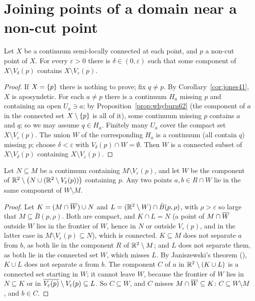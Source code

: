 
\section{Joining points of a domain near a non-cut point}

\begin{lemma}\label{lem:whyburn622}
Let $X$ be a continuum semi-locally connected at each point, and $p$ a non-cut point of $X$. For every $\varepsilon>0$ there is $\delta\in(0,\varepsilon)$
such that some component of $X\setminus V_\delta(p)$ contains $X\setminus V_\varepsilon(p)$.
\end{lemma}

\begin{proof}
If $X=\left\{ p \right\}$ there is nothing to prove; fix $q\ne p$. By Corollary~\ref{cor:jones41}, $X$ is aposyndetic. For each $a\ne p$ there is a continuum $H_a$
missing $p$ and containing an open $U_a\ni a$; by Proposition~\ref{prop:whyburn62} (the component of $a$ in the connected set $X\setminus\left\{ p \right\}$ is all of it), some
continuum missing $p$ contains $a$ and $q$; so we may assume $q\in H_a$. Finitely many $U_a$ cover the compact set $X\setminus V_\varepsilon(p)$. The union $W$ of the
corresponding $H_a$ is a continuum (all contain $q$) missing $p$; choose $\delta<\varepsilon$ with $V_\delta(p)\cap W=\emptyset$. Then $W$ is a connected subset of $X\setminus V_\delta(p)$
containing $X\setminus V_\varepsilon(p)$.
\end{proof}


\begin{lemma}\label{lem:join}
Let $N\subseteq M$ be a continuum containing $M\setminus V_\varepsilon(p)$, and let $W$ be the component of $\mathbb{R}^2\setminus\bigl(N\cup(\mathbb{R}^2\setminus V_\varepsilon(p))\bigr)$ containing $p$. Any two
points $a,b\in R\cap W$ lie in the same component of $W\setminus M$.
\end{lemma}

\begin{proof}
Let $K=(M\cap\overline{W})\cup N$ and $L=(\mathbb{R}^2\setminus W)\cap\bar B(p,\rho)$, with $\rho>\varepsilon$ so large that $M\subseteq\bar B(p,\rho)$. Both are compact, and $K\cap L=N$ (a point of $M\cap\overline{W}$ outside $W$ lies in the frontier of $W$,
hence in $N$ or outside $V_\varepsilon(p)$, and in the latter case in $M\setminus V_\varepsilon(p)\subseteq N$), which is connected. $K\subseteq M$ does not separate $a$ from $b$, as both lie in the component
$R$ of $\mathbb{R}^2\setminus M$; and $L$ does not separate them, as both lie in the connected set $W$, which misses $L$. By Janiszewski's theorem (), $K\cup L$ does not
separate $a$ from $b$. The component $C$ of $a$ in $\mathbb{R}^2\setminus(K\cup L)$ is a connected set starting in $W$; it cannot leave $W$, because the frontier of $W$ lies in $N\subseteq K$ or in
$\overline{V_\varepsilon(p)}\setminus V_\varepsilon(p)\subseteq L$. So $C\subseteq W$, and $C$ misses $M\cap\overline{W}\subseteq K$: $C\subseteq W\setminus M$, and $b\in C$.
\end{proof}

